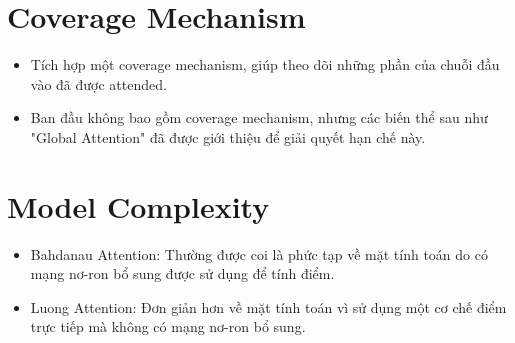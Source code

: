 \documentclass[12pt]{article}
\begin{document}
\section{Coverage Mechanism}
\begin{itemize}
	\item Tích hợp một coverage mechanism, giúp theo dõi những phần của chuỗi đầu vào đã được attended.
	\item Ban đầu không bao gồm coverage mechanism, nhưng các biến thể sau như "Global Attention" đã được giới thiệu để giải quyết hạn chế này.
\end{itemize}
\section{Model Complexity}
\begin{itemize}
	\item Bahdanau Attention: Thường được coi là phức tạp về mặt tính toán do có mạng nơ-ron bổ sung được sử dụng để tính điểm.
	\item Luong Attention: Đơn giản hơn về mặt tính toán vì sử dụng một cơ chế điểm trực tiếp mà không có mạng nơ-ron bổ sung.
\end{itemize}
\end{document}
